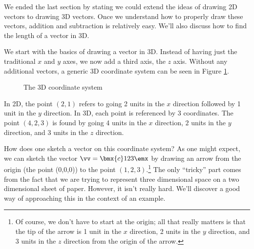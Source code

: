 \clearpage

\label{sec:geom_2}


We ended the last section by stating we could extend the ideas of drawing 2D vectors to drawing 3D vectors. Once we understand how to properly draw these vectors, addition and subtraction is relatively easy. We'll also discuss how to find the length of a vector in 3D. 

We start with the basics of drawing a vector in 3D. Instead of having just the traditional $x$ and $y$ axes, we now add a third axis, the $z$ axis. Without any additional vectors, a generic 3D coordinate system can be seen in Figure \ref{fig:empty_3D}.

\begin{figure}[h!]
\begin{center}
\end{center}
\caption{The 3D coordinate system}
\label{fig:empty_3D}
\end{figure}

In 2D, the point $(2,1)$ refers to going 2 units in the $x$ direction followed by 1 unit in the $y$ direction. In 3D, each point is referenced by 3 coordinates. The point $(4,2,3)$ is found by going 4 units in the $x$ direction, $2$ units in the $y$ direction, and 3 units in the $z$ direction. 

How does one sketch a vector on this coordinate system? As one might expect, we can sketch the vector $\vv = \bmx{c} 1\\2\\3\emx$ by drawing an arrow from the origin (the point (0,0,0)) to the point $(1,2,3)$.\footnote{Of course, we don't have to start at the origin; all that really matters is that the tip of the arrow is 1 unit in the $x$ direction, 2 units in the $y$ direction, and 3 units in the $z$ direction from the origin of the arrow.} The only ``tricky'' part comes from the fact that we are trying to represent three dimensional space on a two dimensional sheet of paper. However, it isn't really hard. We'll discover a good way of approaching this in the context of an example.\\

